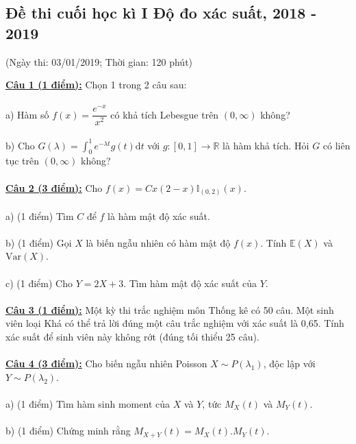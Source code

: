 \documentclass[10pt, a4paper]{article}
\begin{document}
\subsection{Đề thi cuối học kì I Độ đo xác suất, 2018 - 2019}
\begin{center}
	\color{blue}(Ngày thi: 03/01/2019; Thời gian: 120 phút)
\end{center}
\color{red}\underline{\textbf{Câu 1 (1 điểm):}} \color{black}Chọn 1 trong 2 câu sau:\\\\
\color{red}a) \color{black}Hàm số $f(x)=\dfrac{e^{-x}}{x^2}$ có khả tích Lebesgue trên $(0,\infty)$ không?\\\\
\color{red}b) \color{black}Cho $G(\lambda)=\displaystyle\int_0^1e^{-\lambda t}g(t)\text{d}t$ với $g:[0,1]\rightarrow\mathbb R$ là hàm khả tích. Hỏi $G$ có liên tục trên $(0,\infty)$ không?\\\\
\color{red}\underline{\textbf{Câu 2 (3 điểm):}} \color{black}Cho $f(x)=Cx(2-x)\mathbb I_{(0,2)}(x)$.\\\\
\color{red}a) (1 điểm) \color{black}Tìm $C$ để $f$ là hàm mật độ xác suất.\\\\
\color{red}b) (1 điểm) \color{black}Gọi $X$ là biến ngẫu nhiên có hàm mật độ $f(x)$. Tính $\mathbb E(X)$ và $\text{Var}(X)$.\\\\
\color{red}c) (1 điểm) \color{black}Cho $Y=2X+3$. Tìm hàm mật độ xác suất của $Y$.\\\\
\color{red}\underline{\textbf{Câu 3 (1 điểm):}} \color{black}Một kỳ thi trắc nghiệm môn Thống kê có 50 câu. Một sinh viên loại Khá có thể trả lời đúng một câu trắc nghiệm với xác suất là 0,65. Tính xác suất để sinh viên này không rớt (đúng tối thiểu 25 câu).\\\\
\color{red}\underline{\textbf{Câu 4 (3 điểm):}} \color{black}Cho biến ngẫu nhiên Poisson $X\sim P(\lambda_1)$, độc lập với $Y\sim P(\lambda_2)$.\\\\
\color{red}a) (1 điểm) \color{black}Tìm hàm sinh moment của $X$ và $Y$, tức $M_X(t)$ và $M_Y(t)$.\\\\
\color{red}b) (1 điểm) \color{black}Chứng minh rằng $M_{X+Y}(t)=M_X(t).M_Y(t)$.\\\\
\end{document}
